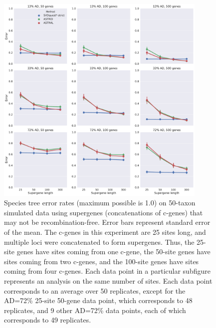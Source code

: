 \clearpage
\begin{figure}
  \centering
  \includegraphics[width=0.9\textwidth]{svdquest-figs/binned_rfdists_nocaml_no1000.pdf}
  \caption[Species tree topological error rates for 50-taxon simulated data with supergenes]{Species tree error rates (maximum possible is 1.0) on 50-taxon simulated data using 
    supergenes (concatenations of c-genes)
    that may not be recombination-free. Error bars represent standard error of the mean. The c-genes in this experiment are 25 sites long, and multiple loci were
    concatenated to form supergenes. Thus, the 
    25-site genes have sites coming from one c-gene, the 50-site genes have
    sites coming from two c-genes, and the 100-site genes have sites coming
    from four c-genes. Each data point in a particular subfigure represents
    an analysis on the same number of sites. 
    {
    Each data point corresponds to an average over 50 replicates, except for the AD=72\% 25-site 50-gene data point, which corresponds to 48 replicates, and 9 other AD=72\%  data points, each of which corresponds to 49 replicates.}
  }\label{svdquest::binned_50}
\end{figure}


